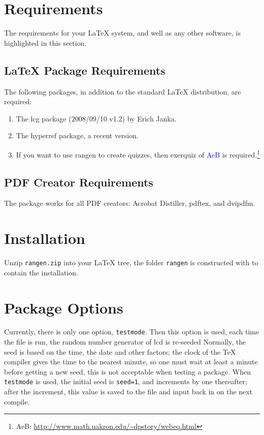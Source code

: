 \documentclass[12pt]{article}
\let\pkg\textsf
\let\opt\texttt
\begin{document}
\section{Requirements}

The requirements for your {\LaTeX} system, and well as any other
software, is highlighted in this section.

\subsection{{\LaTeX} Package Requirements}

The following packages, in addition to the standard {\LaTeX}
distribution, are required:
\begin{enumerate}
  \item The \textsf{lcg} package (2008/09/10 v1.2) by Erich Janka.
  \item The \textsf{hyperref} package, a recent version.
  \item If you want to use \pkg{rangen} to create quizzes, then
  \textsf{exerquiz} of \textcolor{blue}{AeB} is required.\footnote{AeB: \url{http://www.math.uakron.edu/~dpstory/webeq.html}}
\end{enumerate}

\subsection{PDF Creator Requirements}

The package works for all PDF creators: Acrobat Distiller, pdftex, and dvipdfm.

\section{Installation}

Unzip \texttt{rangen.zip} into your {\LaTeX} tree, the folder \texttt{rangen} is constructed
with to contain the installation.

\section{Package Options}

Currently, there is only one option, \opt{testmode}. Then this option is used,
each time the file is run, the random number generator of \pkg{lcd} is re-seeded
Normally, the seed is based on the time, the date and other factors; the clock
of the {\TeX} compiler gives the time to the nearest minute, so one must wait at least
a minute before getting a new seed, this is not acceptable when testing a package.
When \opt{testmode} is used, the initial seed is \texttt{seed=1}, and increments
by one thereafter; after the increment, this value is saved to the file
 and input back in on the next compile.
\end{document}
